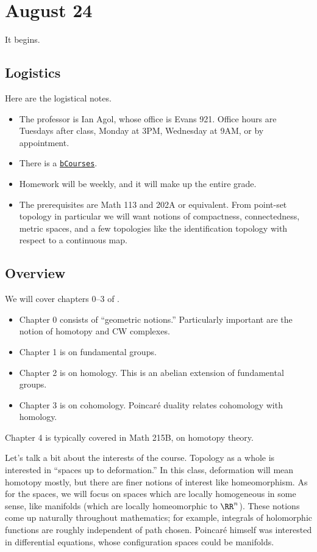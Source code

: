 \documentclass[../notes.tex]{subfiles}
\begin{document}
\section{August 24}

It begins.

\subsection{Logistics}
Here are the logistical notes.
\begin{itemize}
	\item The professor is Ian Agol, whose office is Evans 921. Office hours are Tuesdays after class, Monday at 3PM, Wednesday at 9AM, or by appointment.
	\item There is a \href{https://bcourses.berkeley.edu/courses/1528186/}{\texttt{bCourses}}.
	\item Homework will be weekly, and it will make up the entire grade.
	\item The prerequisites are Math 113 and 202A or equivalent. From point-set topology in particular we will want notions of compactness, connectedness, metric spaces, and a few topologies like the identification topology with respect to a continuous map.
\end{itemize}

\subsection{Overview}
We will cover chapters 0--3 of \cite{hatcher}.
\begin{itemize}
	\item Chapter 0 consists of ``geometric notions.'' Particularly important are the notion of homotopy and CW complexes.
	\item Chapter 1 is on fundamental groups.
	\item Chapter 2 is on homology. This is an abelian extension of fundamental groups.
	\item Chapter 3 is on cohomology. Poincar\'e duality relates cohomology with homology.
\end{itemize}
Chapter 4 is typically covered in Math 215B, on homotopy theory.

Let's talk a bit about the interests of the course. Topology as a whole is interested in ``spaces up to deformation.'' In this class, deformation will mean homotopy mostly, but there are finer notions of interest like homeomorphism. As for the spaces, we will focus on spaces which are locally homogeneous in some sense, like manifolds (which are locally homeomorphic to $\RR^n$). These notions come up naturally throughout mathematics; for example, integrals of holomorphic functions are roughly independent of path chosen. Poincar\'e himself was interested in differential equations, whose configuration spaces could be manifolds.
\end{document}
